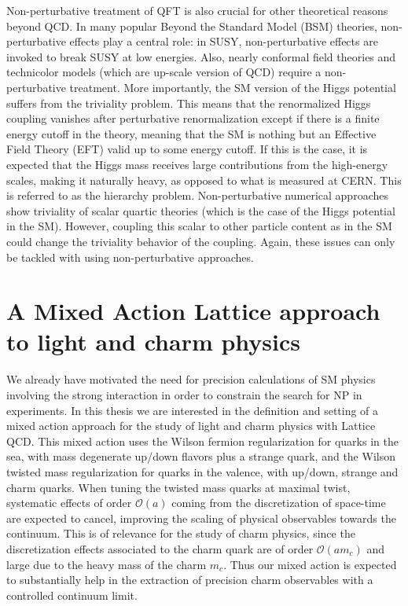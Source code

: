Non-perturbative treatment of QFT is also crucial for other theoretical reasons beyond QCD. In many popular Beyond the Standard Model (BSM) theories, non-perturbative effects play a central role: in SUSY, non-perturbative effects are invoked to break SUSY at low energies. Also, nearly conformal field theories and technicolor models (which are up-scale version of QCD) require a non-perturbative treatment. More importantly, the SM version of the Higgs potential suffers from the triviality problem. This means that the renormalized Higgs coupling vanishes after perturbative renormalization except if there is a finite energy cutoff in the theory, meaning that the SM is nothing but an Effective Field Theory (EFT) valid up to some energy cutoff. If this is the case, it is expected that the Higgs mass receives large contributions from the high-energy scales, making it naturally heavy, as opposed to what is measured at CERN. This is referred to as the hierarchy problem. Non-perturbative numerical approaches show triviality of scalar quartic theories (which is the case of the Higgs potential in the SM). However, coupling this scalar to other particle content as in the SM could change the triviality behavior of the coupling. Again, these issues can only be tackled with using non-perturbative approaches.

\section*{A Mixed Action Lattice approach to light and charm physics}

We already have motivated the need for precision calculations of SM physics involving the strong interaction in order to constrain the search for NP in experiments. In this thesis we are interested in the definition and setting of a mixed action approach for the study of light and charm physics with Lattice QCD. This mixed action uses the Wilson fermion regularization for quarks in the sea, with mass degenerate up/down flavors plus a strange quark, and the Wilson twisted mass regularization for quarks in the valence, with up/down, strange and charm quarks. When tuning the twisted mass quarks at maximal twist, systematic effects of order $\mathcal{O}(a)$ coming from the discretization of space-time are expected to cancel, improving the scaling of physical observables towards the continuum. This is of relevance for the study of charm physics, since the discretization effects associated to the charm quark are of order $\mathcal{O}(am_c)$ and large due to the heavy mass of the charm $m_c$. Thus our mixed action is expected to substantially help in the extraction of precision charm observables with a controlled continuum limit.


